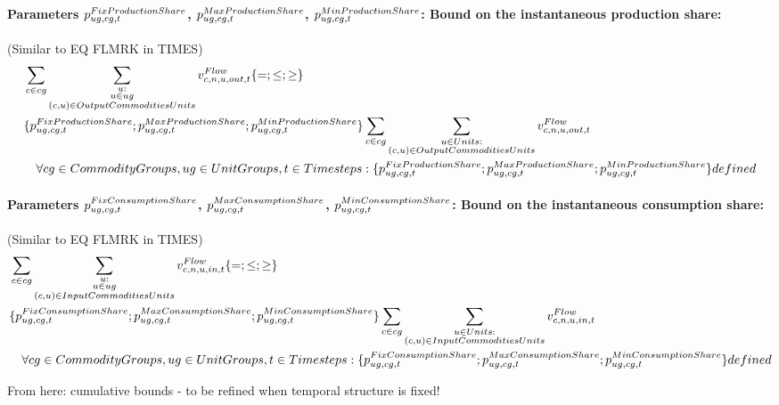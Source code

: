 \paragraph{Parameters $\pFixProductionShare$, $\pMaxProductionShare$, $\pMinProductionShare$: Bound on the instantaneous production share:}
(Similar to EQ FLMRK in TIMES)
\begin{align} \label{eq:productionshare}
&\sum_{\commodity \in \commoditygroup} \sum_{\substack{\unit: \\ \unit \in \unitgroup \\ \OutputCommoditiesUnits}} \vFlow[\commodity,\node,\unit,out,\timestep]
 \{=;\le;\ge\} \nonumber \\
&\{\pFixProductionShare ; \pMaxProductionShare ; \pMinProductionShare \} \sum_{\commodity \in \commoditygroup} \sum_{\substack{\units: \\ \OutputCommoditiesUnits}} \vFlow[\commodity,\node, \unit,out,\timestep] \nonumber \\
&\quad \forall \commoditygroups, \unitgroups, \timesteps : \{\pFixProductionShare ; \pMaxProductionShare ; \pMinProductionShare \} defined
\end{align}

\paragraph{Parameters $\pFixConsumptionShare$, $\pMaxConsumptionShare$, $\pMinConsumptionShare$: Bound on the instantaneous consumption share:}
(Similar to EQ FLMRK in TIMES)
\begin{align} \label{eq:consumptionshare}
&\sum_{\commodity \in \commoditygroup} \sum_{\substack{\unit: \\ \unit \in \unitgroup \\ \InputCommoditiesUnits}} \vFlow[\commodity,\node,\unit,in,\timestep]
 \{=;\le;\ge\} \nonumber \\
&\{ \pFixConsumptionShare ; \pMaxConsumptionShare ; \pMinConsumptionShare \} \sum_{\commodity \in \commoditygroup} \sum_{\substack{\units: \\ \InputCommoditiesUnits}} \vFlow[\commodity,\node, \unit,in,\timestep] \nonumber \\
&\quad \forall \commoditygroups, \unitgroups, \timesteps : \{ \pFixConsumptionShare ; \pMaxConsumptionShare ; \pMinConsumptionShare \} defined
\end{align}


{\color{red}From here: cumulative bounds - to be refined when temporal structure is fixed!}
